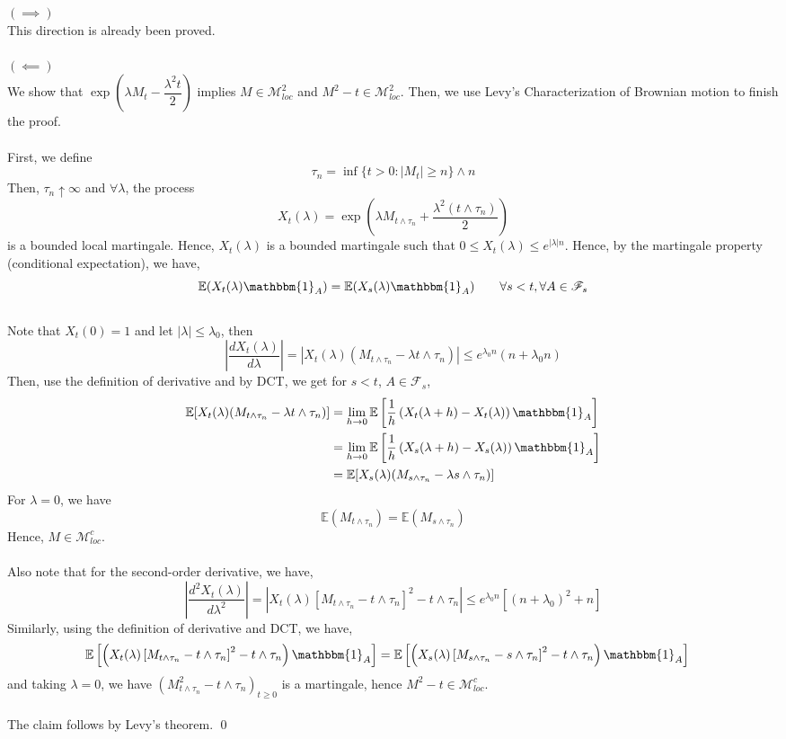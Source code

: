 \documentclass[12pt,a4paper]{article}
\newcommand{\E}{\mathbb{E}}
\renewenvironment{proof}
    {\begin{trivlist}\item[\hskip\labelsep\color{blue}\bfseries Proof:]}
    {\qed\end{trivlist}}
\begin{document}
\begin{proof}
    $(\implies)$\\
    This direction is already been proved.\\
    \\
    $(\impliedby)$\\
    We show that $\exp\left(\lambda M_t -\dfrac{\lambda^2 t}{2}\right)$ implies $M\in \mathcal{M}^{2}_{loc}$ and $M^2-t \in\mathcal{M}^2_{loc}$. Then, we use Levy's Characterization of Brownian motion to finish the proof.\\
    \\
    First, we define
    $$
    \tau_n = \inf\{t>0: |M_t|\ge n\}\wedge n
    $$
    Then, $\tau_n\uparrow \infty$ and $\forall \lambda$, the process
    $$
    X_t(\lambda) = \exp\left(\lambda M_{t\wedge \tau_n} + \frac{\lambda^2 (t\wedge \tau_n)}{2}\right)
    $$
    is a bounded local martingale. Hence, $X_t(\lambda)$ is a bounded martingale such that $0\le X_t(\lambda) \le e^{|\lambda|n}$. Hence, by the martingale property (conditional expectation), we have,
    $$
    \E(X_t(\lambda) \mathbbm{1}_{A}) = \E(X_s(\lambda)\mathbbm{1}_A) \qquad\forall s<t, \forall A\in\mathscr{F}_s
    $$
    \\
    Note that $X_t(0)=1$ and let $|\lambda|\le \lambda_0$, then
    $$
    \left|\frac{d X_t(\lambda)}{d\lambda}\right| = \left|X_t(\lambda) (M_{t\wedge\tau_n}-\lambda t\wedge \tau_n)\right| \le e^{\lambda_0 n} (n + \lambda_0 n)
    $$
    Then, use the definition of derivative and by DCT, we get for $s<t$, $A\in\mathscr{F}_s$,
    \begin{align*}
        \E[X_t(\lambda) (M_{t\wedge\tau_n}-\lambda t\wedge \tau_n)] &= \lim_{h\to 0} \E\left[\frac{1}{h} \left(X_t(\lambda+h)-X_t(\lambda)\right)\mathbbm{1}_A\right]\\
        &= \lim_{h\to 0} \E\left[\frac{1}{h} \left(X_s(\lambda+h)-X_s(\lambda)\right)\mathbbm{1}_A\right]\\
        &= \E[X_s(\lambda) (M_{s\wedge\tau_n}-\lambda s\wedge \tau_n)]
    \end{align*}
    For $\lambda = 0$, we have
    $$
    \E (M_{t\wedge\tau_n}) = \E(M_{s\wedge \tau_n})
    $$
    Hence, $M\in\mathcal{M}^c_{loc}$.\\
    \\
    Also note that for the second-order derivative, we have,
    $$
    \left|\frac{d^2 X_t(\lambda)}{d \lambda^2}\right| = \left|X_t(\lambda)\left[M_{t\wedge \tau_n} - t\wedge\tau_n\right]^2-t\wedge \tau_n\right|\le e^{\lambda_0 n }\left[(n+\lambda_0)^2+n\right]
    $$
    Similarly, using the definition of derivative and DCT, we have,
    \begin{align*}
        \E\left[\left(X_t(\lambda)\left[M_{t\wedge \tau_n} - t\wedge\tau_n\right]^2-t\wedge \tau_n\right) \mathbbm{1}_A\right] &= \E\left[\left(X_s(\lambda)\left[M_{s\wedge \tau_n} - s\wedge\tau_n\right]^2-t\wedge \tau_n\right) \mathbbm{1}_A\right]
    \end{align*}
    and taking $\lambda=0$, we have $\left(M^2_{t\wedge \tau_n}-t\wedge \tau_n\right)_{t\ge 0}$ is a martingale, hence $M^2-t\in\mathcal{M}^{c}_{loc}$.\\
    \\
    The claim follows by Levy's theorem.
\end{proof}
\end{document}
